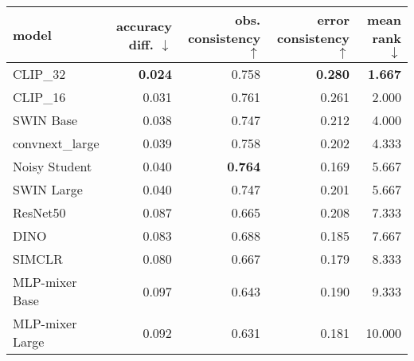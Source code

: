 \begin{tabular}{lrrrr}
\toprule
          model & accuracy diff. $\downarrow$ & obs. consistency $\uparrow$ & error consistency $\uparrow$ & mean rank $\downarrow$ \\
\midrule
       CLIP\_32 &              \textbf{0.024} &                       0.758 &               \textbf{0.280} &         \textbf{1.667} \\
       CLIP\_16 &                       0.031 &                       0.761 &                        0.261 &                  2.000 \\
      SWIN Base &                       0.038 &                       0.747 &                        0.212 &                  4.000 \\
convnext\_large &                       0.039 &                       0.758 &                        0.202 &                  4.333 \\
  Noisy Student &                       0.040 &              \textbf{0.764} &                        0.169 &                  5.667 \\
     SWIN Large &                       0.040 &                       0.747 &                        0.201 &                  5.667 \\
       ResNet50 &                       0.087 &                       0.665 &                        0.208 &                  7.333 \\
           DINO &                       0.083 &                       0.688 &                        0.185 &                  7.667 \\
         SIMCLR &                       0.080 &                       0.667 &                        0.179 &                  8.333 \\
 MLP-mixer Base &                       0.097 &                       0.643 &                        0.190 &                  9.333 \\
MLP-mixer Large &                       0.092 &                       0.631 &                        0.181 &                 10.000 \\
\bottomrule
\end{tabular}

